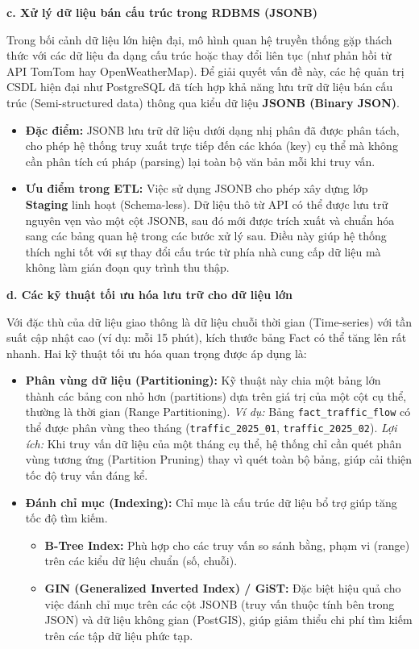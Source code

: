 \textbf{c. Xử lý dữ liệu bán cấu trúc trong RDBMS (JSONB)}

Trong bối cảnh dữ liệu lớn hiện đại, mô hình quan hệ truyền thống gặp thách thức với các dữ liệu đa dạng cấu trúc hoặc thay đổi liên tục (như phản hồi từ API TomTom hay OpenWeatherMap). Để giải quyết vấn đề này, các hệ quản trị CSDL hiện đại như PostgreSQL đã tích hợp khả năng lưu trữ dữ liệu bán cấu trúc (Semi-structured data) thông qua kiểu dữ liệu \textbf{JSONB (Binary JSON)}.

\begin{itemize}
    \item \textbf{Đặc điểm:} JSONB lưu trữ dữ liệu dưới dạng nhị phân đã được phân tách, cho phép hệ thống truy xuất trực tiếp đến các khóa (key) cụ thể mà không cần phân tích cú pháp (parsing) lại toàn bộ văn bản mỗi khi truy vấn.
    \item \textbf{Ưu điểm trong ETL:} Việc sử dụng JSONB cho phép xây dựng lớp \textbf{Staging} linh hoạt (Schema-less). Dữ liệu thô từ API có thể được lưu trữ nguyên vẹn vào một cột JSONB, sau đó mới được trích xuất và chuẩn hóa sang các bảng quan hệ trong các bước xử lý sau. Điều này giúp hệ thống thích nghi tốt với sự thay đổi cấu trúc từ phía nhà cung cấp dữ liệu mà không làm gián đoạn quy trình thu thập.
\end{itemize}

\textbf{d. Các kỹ thuật tối ưu hóa lưu trữ cho dữ liệu lớn}

Với đặc thù của dữ liệu giao thông là dữ liệu chuỗi thời gian (Time-series) với tần suất cập nhật cao (ví dụ: mỗi 15 phút), kích thước bảng Fact có thể tăng lên rất nhanh. Hai kỹ thuật tối ưu hóa quan trọng được áp dụng là:
\begin{itemize}
    \item \textbf{Phân vùng dữ liệu (Partitioning):} Kỹ thuật này chia một bảng lớn thành các bảng con nhỏ hơn (partitions) dựa trên giá trị của một cột cụ thể, thường là thời gian (Range Partitioning).
    \textit{Ví dụ:} Bảng \texttt{fact\_traffic\_flow} có thể được phân vùng theo tháng (\texttt{traffic\_2025\_01}, \texttt{traffic\_2025\_02}).
    \textit{Lợi ích:} Khi truy vấn dữ liệu của một tháng cụ thể, hệ thống chỉ cần quét phân vùng tương ứng (Partition Pruning) thay vì quét toàn bộ bảng, giúp cải thiện tốc độ truy vấn đáng kể.
    
    \item \textbf{Đánh chỉ mục (Indexing):} Chỉ mục là cấu trúc dữ liệu bổ trợ giúp tăng tốc độ tìm kiếm.
    \begin{itemize}
        \item \textbf{B-Tree Index:} Phù hợp cho các truy vấn so sánh bằng, phạm vi (range) trên các kiểu dữ liệu chuẩn (số, chuỗi).
        \item \textbf{GIN (Generalized Inverted Index) / GiST:} Đặc biệt hiệu quả cho việc đánh chỉ mục trên các cột JSONB (truy vấn thuộc tính bên trong JSON) và dữ liệu không gian (PostGIS), giúp giảm thiểu chi phí tìm kiếm trên các tập dữ liệu phức tạp.
    \end{itemize}
\end{itemize}

